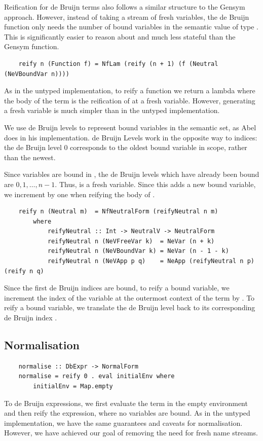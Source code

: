 Reification for de Bruijn terms also follows a similar structure to the Gensym approach. However, instead of taking a stream of fresh variables, the de Bruijn  function only needs the number of bound variables in the semantic value of type . This is significantly easier to reason about and much less stateful than the Gensym  function.

\begin{lstlisting}
    reify n (Function f) = NfLam (reify (n + 1) (f (Neutral (NeVBoundVar n))))
\end{lstlisting}

As in the untyped implementation, to reify a function  we return a lambda where the body of the term is the reification of  at a fresh variable. However, generating a fresh variable is much simpler than in the untyped implementation. 

We use de Bruijn levels to represent bound variables in the semantic set, as Abel does in his implementation. de Bruijn Levels work in the opposite way to indices: the de Bruijn level 0 corresponds to the oldest bound variable in scope, rather than the newest. 

Since  variables are bound in , the de Bruijn levels which have already been bound are $0, 1, \dots, n - 1$. Thus,  is a fresh variable. Since this adds a new bound variable, we increment  by one when reifying the body of .

\begin{lstlisting}
    reify n (Neutral m)  = NfNeutralForm (reifyNeutral n m)
        where
            reifyNeutral :: Int -> NeutralV -> NeutralForm
            reifyNeutral n (NeVFreeVar k)  = NeVar (n + k)
            reifyNeutral n (NeVBoundVar k) = NeVar (n - 1 - k)
            reifyNeutral n (NeVApp p q)    = NeApp (reifyNeutral n p) (reify n q)
\end{lstlisting}

Since the first  de Bruijn indices are bound, to reify a bound variable, we increment the index of the variable at the outermost context of the term  by .
To reify a bound variable, we translate the de Bruijn level  back to its corresponding de Bruijn index .

\subsection{Normalisation}

\begin{lstlisting}
    normalise :: DbExpr -> NormalForm
    normalise = reify 0 . eval initialEnv where
        initialEnv = Map.empty  
\end{lstlisting}

To  de Bruijn expressions, we first evaluate the term in the empty environment and then reify the expression, where no variables are bound. As in the untyped implementation, we have the same guarantees and caveats for normalisation. However, we have achieved our goal of removing the need for fresh name streams.